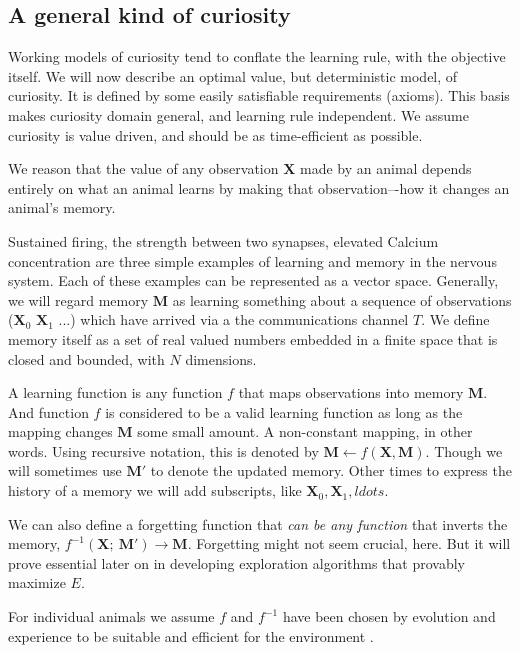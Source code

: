 \subsection{A general kind of curiosity} 
Working models of curiosity tend to conflate the learning rule, with the objective itself. We will now describe an optimal value, but deterministic model, of curiosity. It is defined by some easily satisfiable requirements (axioms). This basis makes curiosity domain general, and learning rule independent. We assume curiosity is value driven, and should be as time-efficient as possible.

We reason that the value of any observation $\mathbf{X}$ made by an animal depends entirely on what an animal learns by making that observation–-how it changes an animal's memory.

Sustained firing, the strength between two synapses, elevated Calcium concentration are three simple examples of learning and memory in the nervous system. Each of these examples can be represented as a vector space. Generally, we will regard memory $\mathbf{M}$ as learning something about a sequence of observations ($\mathbf{X}_0$ $\mathbf{X}_1$ ...) which have arrived via a the communications channel $T$. We define memory itself as a set of real valued numbers embedded in a finite space that is closed and bounded, with $N$ dimensions. 

A learning function is any function $f$ that maps observations into memory $\mathbf{M}$. And function $f$ is considered to be a valid learning function as long as the mapping changes $\mathbf{M}$ some small amount. A non-constant mapping, in other words. Using recursive notation, this is denoted by $\mathbf{M} \leftarrow f(\mathbf{X},\mathbf{M}) $. Though we will sometimes use $\mathbf{M'}$ to denote the updated memory. Other times to express the history of a memory we will add subscripts, like $\mathbf{X}_0,\mathbf{X}_1,ldots$. 

We can also define a forgetting function that \textit{can be any function} that inverts the memory, $f^{-1}(\mathbf{X};\ \mathbf{M}') \rightarrow \mathbf{M}$. Forgetting might not seem crucial, here. But it will prove essential later on in developing exploration algorithms that provably maximize $E$. 

For individual animals we assume $f$ and $f^{-1}$ have been chosen by evolution and experience to be suitable and efficient for the environment \cite{Valiant1984,Thrun1992a,Schmidhuber1991,Oudeyer2016,Pathak2017,Gottlieb2018,Wilson2020,Schwartenbeck2019}. 


